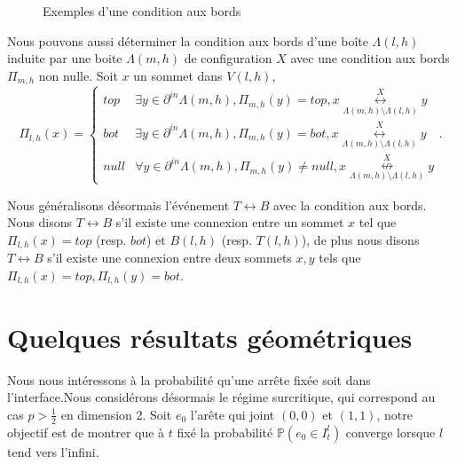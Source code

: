 \documentclass[titlepage,a4paper,12pt]{article}
\newcounter{cor}
\begin{document}
\begin{figure}[h]
\center
{}
\caption{Exemples d'une condition aux bords}
\end{figure}

Nous pouvons aussi déterminer la condition aux bords d'une boîte $\Lambda(l,h)$ induite par une boite $\Lambda(m,h)$ de configuration $X$ avec une condition aux bords $\Pi_{m,h}$ non nulle. Soit $x$ un sommet dans $V(l,h)$, 
$$\Pi_{l,h}(x)=\left\lbrace \begin{array}{cl}
top & \exists y \in \partial^{in}\Lambda(m,h), \Pi_{m,h}(y) = top, x\overset{X}{\underset{\Lambda(m,h) \setminus \Lambda(l,h)}{\longleftrightarrow}} y\\
bot & \exists y \in \partial^{in}\Lambda(m,h), \Pi_{m,h}(y) = bot, x\overset{X}{\underset{\Lambda(m,h) \setminus \Lambda(l,h)}{\longleftrightarrow}} y\\
null & \forall y \in \partial^{in}\Lambda(m,h), \Pi_{m,h}(y) \neq null, x\overset{X}{\underset{\Lambda(m,h) \setminus \Lambda(l,h)}{\nleftrightarrow}} y
\end{array} \right..
$$

Nous généralisons désormais l'événement $T\leftrightarrow B$ avec la condition aux bords. Nous disons $T\leftrightarrow B$ s'il existe une connexion entre un sommet $x$ tel que $\Pi_{l,h}(x)= top$ (resp. $bot$) et $B(l,h)$ (resp. $T(l,h)$), de plus nous disons $T\leftrightarrow B$ s'il existe une connexion entre deux sommets $x,y$ tels que $\Pi_{l,h}(x) = top, \Pi_{l,h}(y) = bot$.
\section{Quelques résultats géométriques}
Nous nous intéressons à la probabilité qu'une arrête fixée soit dans l'interface.Nous considérons désormais le régime surcritique, qui correspond au cas $p>\frac{1}{2}$ en dimension 2. Soit $e_0$ l'arête qui joint $(0,0)$ et $(1,1)$, notre objectif est de montrer que à $t$ fixé la probabilité $\mathbb{P}(e_0 \in I^l_t)$ converge lorsque $l$ tend vers l'infini.
\end{document}
